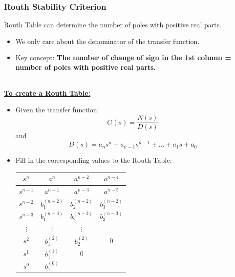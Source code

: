 \subsubsection{Routh Stability Criterion}
Routh Table can determine the number of poles with positive real parts.
\begin{itemize}
\item We only care about the denominator of the transfer function. 
\item Key concept: \textbf{The number of change of sign in the 1st column  = number of poles with positive real parts.}
\end{itemize}
\ \\
\underline{\textbf{To create a Routh Table:}}
\begin{itemize}
\item Given the transfer function:
    \[G(s) = \frac{N(s)}{D(s)}\]
    and 
    \[D(s) = a_{n}s^{n}+a_{n-1}s^{n-1}+\ldots+a_{1}s+a_{0}\]
    
    \item Fill in the corresponding values to the Routh Table:
        \begin{table}[H]
            \centering 
            \begin{tabular}{c|c|c|c}
                 $s^{n}$ & $a^{n}$ & $a^{n-2}$ & $a^{n-4}$\\ \hline
                 $s^{n-1}$ & $a^{n-1}$ & $a^{n-3}$ & $a^{n-5}$\\ \hline \hline
                 $s^{n-2}$ & $b^{(n-2)}_{1}$ & $b^{(n-2)}_{2}$ & $b^{(n-2)}_{3}$ \\ \hline 
                 $s^{n-3}$ & $b^{(n-3)}_{1}$ & $b^{(n-3)}_{2}$ & $b^{(n-3)}_{3}$\\ \hline
                 $\vdots$&$\vdots$&$\vdots$&\\ \hline
                 $s^{2}$ & $b^{(2)}_{1}$ & $b^{(2)}_{2}$ & 0 \\ \hline
                 $s^{1}$ & $b^{(1)}_{1}$ & 0 & \\ \hline
                 $s^{0}$ & $b^{(0)}_{1}$ & &\\ \hline
            \end{tabular}
         \end{table}
         

\end{itemize}
